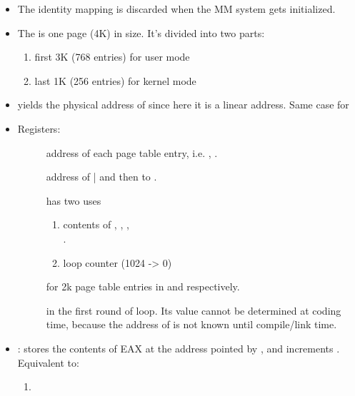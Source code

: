 \begin{itemize}
\item The identity mapping is discarded when the MM system gets initialized.
\item {}
  
  The  is one page (4K) in size. It's divided into two parts:
  \begin{enumerate}
  \item first 3K (768 entries) for user mode
  \item last 1K (256 entries) for kernel mode
  \end{enumerate}
\item {} yields the physical address of  since here
  it is a linear address. Same case for 
\item Registers:
  \begin{description}
  \item[] address of each page table entry, i.e. ,
    .
  \item[] address of | and then to
    .
  \item[] has two uses
    \begin{enumerate}
    \item contents of , ,
      ,\\ .
    \item loop counter (1024 -> 0)
    \end{enumerate}
  \item[]  for 2k page table entries in
     and  respectively.
  \item[]  in the first round of loop. Its
    value cannot be determined at coding time, because the address of  is
    not known until compile/link time.
  \end{description}
\item {}: stores the contents of EAX at the address
  pointed by , and increments . Equivalent to: 
  \begin{enumerate}
  \item {}

\end{enumerate}
\end{itemize}
